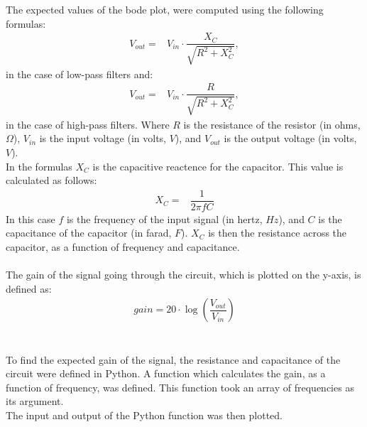 The expected values of the bode plot, were computed using the following formulas:
\begin{align}
	V_{out} =& V_{in} \cdot \dfrac{X_C}{\sqrt{R^2+X_{C}^2}},
\end{align}
in the case of low-pass filters and:
\begin{align}
	V_{out} =& V_{in} \cdot \dfrac{R}{\sqrt{R^2+X_{C}^2}},
\end{align}
in the case of high-pass filters.
Where $R$ is the resistance of the resistor (in ohms, $\Omega$), $V_{in}$ is the input voltage (in volts, $V$), and $V_{out}$ is the output voltage (in volts, $V$).
\\
In the formulas $X_C$ is the capacitive reactence for the capacitor. This value is calculated as follows:
\begin{align*}
	X_C =& \dfrac{1}{2\pi fC}
\end{align*}
In this case $f$ is the frequency of the input signal (in hertz, $Hz$), and $C$ is the capacitance of the capacitor (in farad, $F$). $X_C$ is then the resistance across the capacitor, as a function of frequency and capacitance.
\\
\\
The gain of the signal going through the circuit, which is plotted on the y-axis, is defined as:
\begin{align*}
	gain = 20 \cdot \log{\left( \dfrac{V_{out}}{V_{in}} \right)}
\end{align*}
\\
\\
To find the expected gain of the signal, the resistance and capacitance of the circuit were defined in Python. A function which calculates the gain, as a function of frequency, was defined. This function took an array of frequencies as its argument.
\\
The input and output of the Python function was then plotted.